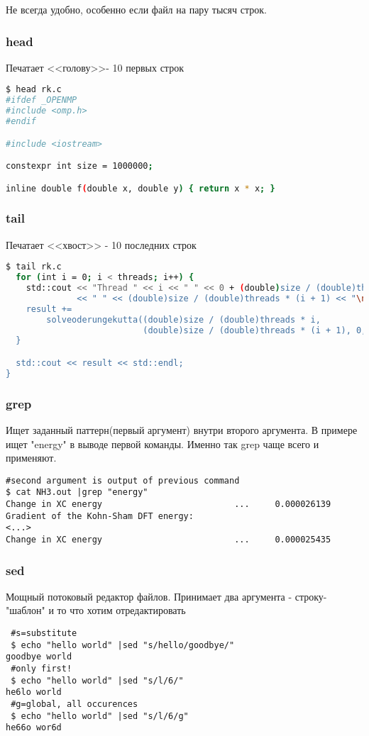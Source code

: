 \documentclass[11pt]{article}
\begin{document}
Не всегда удобно, особенно если файл на пару тысяч строк.
\subsubsection*{head}
Печатает <<голову>>- 10 первых строк
\begin{lstlisting}[language=bash]
 $ head rk.c
#ifdef _OPENMP
#include <omp.h>
#endif

#include <iostream>

constexpr int size = 1000000;

inline double f(double x, double y) { return x * x; }
\end{lstlisting}

\subsubsection*{tail}
Печатает <<хвост>> - 10 последних строк
\begin{lstlisting}[language=bash]
 $ tail rk.c
  for (int i = 0; i < threads; i++) {
    std::cout << "Thread " << i << " " << 0 + (double)size / (double)threads * i
              << " " << (double)size / (double)threads * (i + 1) << "\n";
    result +=
        solveoderungekutta((double)size / (double)threads * i,
                           (double)size / (double)threads * (i + 1), 0, 0.0001);
  }

  std::cout << result << std::endl;
}
\end{lstlisting}

\subsubsection*{grep}

Ищет заданный паттерн(первый аргумент) внутри второго аргумента. В примере ищет "energy" в выводе первой команды. Именно так grep чаще всего и применяют.

\begin{lstlisting}
#second argument is output of previous command
$ cat NH3.out |grep "energy" 
Change in XC energy                          ...     0.000026139
Gradient of the Kohn-Sham DFT energy:
<...>
Change in XC energy                          ...     0.000025435

\end{lstlisting} 

\subsubsection{sed}
Мощный потоковый редактор файлов. Принимает два аргумента - строку-"шаблон" и то что хотим отредактировать
\begin{lstlisting}
 #s=substitute
 $ echo "hello world" |sed "s/hello/goodbye/"
goodbye world
 #only first!
 $ echo "hello world" |sed "s/l/6/"
he6lo world
 #g=global, all occurences
 $ echo "hello world" |sed "s/l/6/g"
he66o wor6d
\end{lstlisting}
\end{document}

